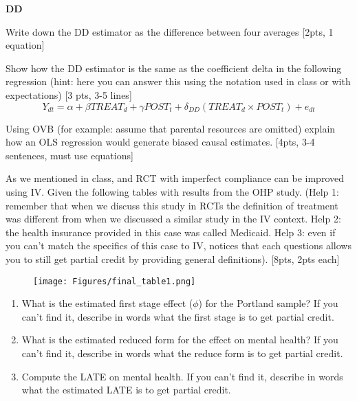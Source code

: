 \textbf{DD}
\item Write down the DD estimator as the difference between four averages [2pts, 1 equation]
\vspace{2cm}
\item Show how the DD estimator is the same as the coefficient delta in the following regression (hint: here you can answer this using the notation used in class or with expectations) [3 pts, 3-5 lines]
$$
Y_{d t}=\alpha+\beta T R E A T_{d}+\gamma P O S T_{t}+\delta_{D D}\left(T R E A T_{d} \times P O S T_{t}\right)+e_{d t}
$$
\vspace{2cm}

\item Using OVB (for example: assume that parental resources are omitted) explain how an OLS regression would generate biased causal estimates. [4pts, 3-4 sentences, must use equations]


\item As we mentioned in class, and RCT with imperfect compliance can be improved using IV. Given the following tables with results from the OHP study. 
(Help 1: remember that when we discuss this study in RCTs the definition of treatment was different from when we discussed a similar study in the IV context. Help 2: the health insurance provided in this case was called Medicaid. Help 3: even if you can't match the specifics of this case to IV, notices that each questions allows you to still get partial credit by providing general definitions). [8pts, 2pts each]
 \begin{figure}[H]
    \centering
    \texttt{[image: Figures/final\_table1.png]}
    \label{}
\end{figure}
 \begin{enumerate}[label=\alph*)]
    \item What is the estimated first stage effect ($\phi$) for the Portland sample? If you can’t find it, describe in words what the first stage is to get partial credit. 
    \vspace{2cm}
    \item What is the estimated reduced form for the effect on mental health? If you can’t find it, describe in words what the reduce form is to get partial credit.
    \vspace{2cm}
    \item Compute the LATE on mental health. If you can’t find it, describe in words what the estimated LATE is to get partial credit. 
    \vspace{2cm}
   \end{enumerate}

